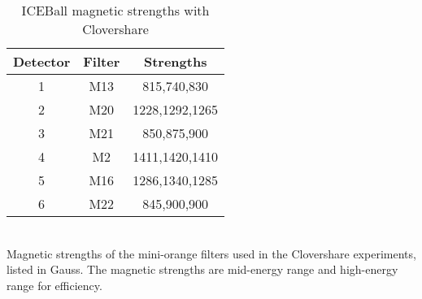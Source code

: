 \begin{table}[]
    \centering
    \caption{ICEBall magnetic strengths with Clovershare}
     \label{tab:ICE_Magnet_C}
    \begin{tabular}{c|c|c} \toprule
         Detector & Filter & Strengths \\
         \hline
         1 & M13 & 815,740,830 \\ 
         2 & M20 & 1228,1292,1265\\
         3 & M21 & 850,875,900 \\
         4 & M2 & 1411,1420,1410\\
         5 & M16 & 1286,1340,1285\\
         6 & M22 & 845,900,900\\ \bottomrule
    \end{tabular}
    \\[2]
    \footnotesize
    Magnetic strengths of the mini-orange filters used in the Clovershare experiments, listed in Gauss. The magnetic strengths are mid-energy range and high-energy range for efficiency.
\end{table}